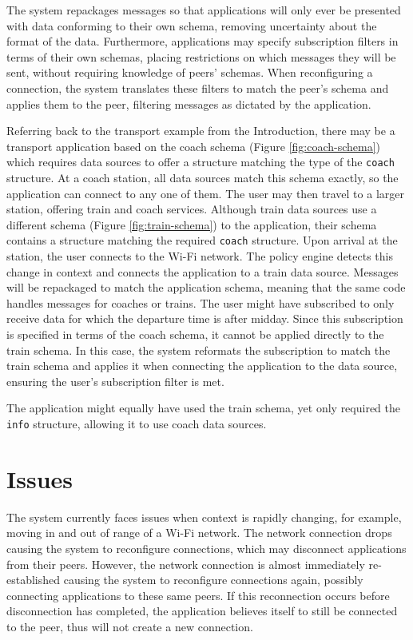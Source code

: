 \documentclass[12pt,twoside,notitlepage]{report}
\begin{document}
The system repackages messages so that applications will only ever be presented with data conforming to their own schema, removing uncertainty about the format of the data.
Furthermore, applications may specify subscription filters in terms of their own schemas, placing restrictions on which messages they will be sent, without requiring knowledge of peers' schemas.
When reconfiguring a connection, the system translates these filters to match the peer's schema and applies them to the peer, filtering messages as dictated by the application.

Referring back to the transport example from the Introduction, there may be a transport application based on the coach schema (Figure \ref{fig:coach-schema}) which requires data sources to offer a structure matching the type of the {\tt coach} structure. 
At a coach station, all data sources match this schema exactly, so the application can connect to any one of them. 
The user may then travel to a larger station, offering train and coach services. 
Although train data sources use a different schema (Figure \ref{fig:train-schema}) to the application, their schema contains a structure matching the required {\tt coach} structure.
Upon arrival at the station, the user connects to the Wi-Fi network. The policy engine detects this change in context and connects the application to a train data source. 
Messages will be repackaged to match the application schema, meaning that the same code handles messages for coaches or trains.
The user might have subscribed to only receive data for which the departure time is after midday. 
Since this subscription is specified in terms of the coach schema, it cannot be applied directly to the train schema. 
In this case, the system reformats the subscription to match the train schema and applies it when connecting the application to the data source, ensuring the user's subscription filter is met.

The application might equally have used the train schema, yet only required the {\tt info} structure, allowing it to use coach data sources.

\section{Issues}
The system currently faces issues when context is rapidly changing, for example, moving in and out of range of a Wi-Fi network. 
The network connection drops causing the system to reconfigure connections, which may disconnect applications from their peers.
However, the network connection is almost immediately re-established causing the system to reconfigure connections again, possibly connecting applications to these same peers. 
If this reconnection occurs before disconnection has completed, the application believes itself to still be connected to the peer, thus will not create a new connection.
\end{document}
